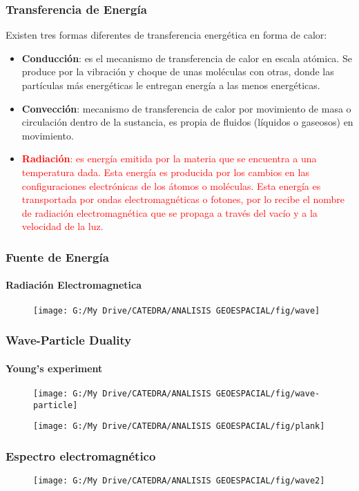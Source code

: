 \documentclass[14pt]{beamer}
\begin{document}
\begin{frame}
\frametitle{Transferencia de Energía}
\scriptsize{Existen tres formas diferentes de transferencia energética en forma de calor}:
\begin{itemize}
\item \textbf{Conducción}: es el mecanismo de transferencia de calor en escala atómica. Se produce por la vibración y  choque de unas moléculas con otras, donde las partículas más energéticas le entregan energía a las menos energéticas.
\item \textbf{Convección}: mecanismo de transferencia de calor por movimiento de masa o circulación dentro de la sustancia, es propia de fluidos (líquidos o gaseosos) en movimiento.
\item \textcolor{red}{\textbf{Radiación}: es energía emitida por la materia que se encuentra a una temperatura dada. Esta energía es producida por los cambios en las configuraciones electrónicas de los átomos o moléculas. Esta energía es transportada por ondas electromagnéticas o fotones, por lo recibe el nombre de radiación electromagnética que se propaga a través del vacío y a la velocidad de la luz.}
\end{itemize}
\end{frame}
\begin{frame}
\frametitle{Fuente de Energía}
\framesubtitle{Radiación Electromagnetica}
  \begin{figure}
    \centering
    \texttt{[image: G:/My Drive/CATEDRA/ANALISIS GEOESPACIAL/fig/wave]}
\tiny{}
 \end{figure}
\end{frame}
\begin{frame}
\frametitle{Wave-Particle Duality}
\framesubtitle{Young's experiment}
\begin{figure}
\centering
\texttt{[image: G:/My Drive/CATEDRA/ANALISIS GEOESPACIAL/fig/wave-particle]}
\end{figure}
\begin{figure}
\centering
\texttt{[image: G:/My Drive/CATEDRA/ANALISIS GEOESPACIAL/fig/plank]}
\end{figure}
\end{frame}
\begin{frame}
\frametitle{Espectro electromagnético}
  \begin{figure}
    \centering
    \texttt{[image: G:/My Drive/CATEDRA/ANALISIS GEOESPACIAL/fig/wave2]}
  \end{figure}
\end{frame}
\end{document}
